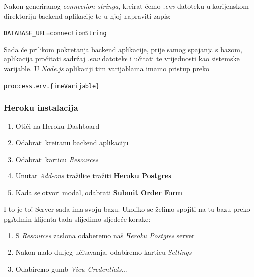 								Nakon generiranog \textit{connection stringa}, kreirat ćemo \textit{.env} datoteku u korijenskom direktoriju backend aplikacije te u njoj napraviti zapis:

								\begin{center}
										\texttt{DATABASE\_URL={connectionString}}
								\end{center}
								
								Sada će prilikom pokretanja backend aplikacije, prije samog spajanja s bazom, aplikacija pročitati sadržaj \textit{.env} datoteke i učitati te vrijednosti kao sistemske varijable. U \textit{Node.js} aplikaciji tim varijablama imamo pristup preko

								\begin{center}
										\texttt{proccess.env.\{imeVarijable\}}
								\end{center}
				
				
						\subsubsection*{Heroku instalacija}
						
								\begin{enumerate}
										\item Otići na Heroku Dashboard
										\item Odabrati kreiranu backend aplikaciju
										\item Odabrati karticu \textit{Resources}
										\item Unutar \textit{Add-ons} tražilice tražiti \textbf{Heroku Postgres}
										\item Kada se otvori modal, odabrati \textbf{Submit Order Form}
								\end{enumerate}
								
								I to je to! Server sada ima svoju bazu. Ukoliko se želimo spojiti na tu bazu preko pgAdmin klijenta tada slijedimo sljedeće korake:
								
								\begin{enumerate}
										\item S \textit{Resources} zaslona odaberemo naš \textit{Heroku Postgres} server
										\item Nakon malo duljeg učitavanja, odabiremo karticu \textit{Settings}
										\item Odabiremo gumb \textit{View Credentials...}
								\end{enumerate}
								
